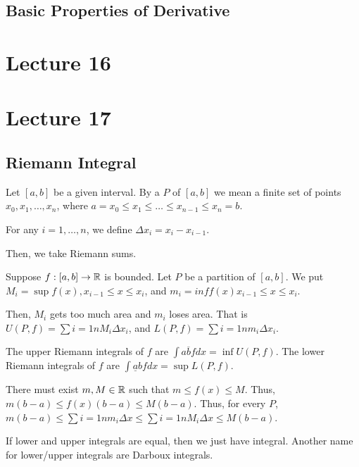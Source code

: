 \documentclass{book}
\begin{document}
\subsection{Basic Properties of Derivative}
\section{Lecture 16}
\begin{thm}
\end{thm}

\begin{thm}
\end{thm}
\section{Lecture 17}
\subsection{Riemann Integral}
\begin{defn}
    Let $[a, b]$ be a given interval. By a  $P$ of $[a, b]$ we mean a finite set of points $x_0, x_1, \ldots, x_n$, where $a = x_0 \leq x_1 \leq \ldots \leq x_{n - 1} \leq x_n = b$.

    For any $i = 1, \ldots, n$, we define $\Delta x_i = x_i - x_{i - 1}$. 
\end{defn}

Then, we take Riemann sums.

Suppose $f : [a, b] \to \mathbb{R}$ is bounded. Let $P$ be a partition of $[a, b]$. We put $M_i = \sup f(x), x_{i-1} \leq x \leq x_i$, and $m_i = inf f(x) x_{i-1} \leq x \leq x_i$. 

Then, $M_i$ gets too much area and $m_i$ loses area. That is $U(P, f) = \sum{i = 1}{n} M_i \Delta x_i$, and $L(P, f) = \sum{i = 1}{n} m_i \Delta x_i$. 

The upper Riemann integrals of $f$ are $\int{a}{\overline b} f dx = \inf U(P, f)$. The lower Riemann integrals of $f$ are $\int{\underline a}{b} f dx = \sup L(P, f)$.

There must exist $m, M \in \mathbb{R}$ such that $m \leq f(x) \leq M$. Thus, $m(b - a) \leq f(x)(b - a) \leq M(b - a)$. Thus, for every $P$, $m(b - a) \leq \sum{i = 1}{n} m_i \Delta x \leq \sum{i = 1}{n} M_i \Delta x \leq M(b - a)$.

If lower and upper integrals are equal, then we just have integral. Another name for lower/upper integrals are Darboux integrals.
\end{document}
